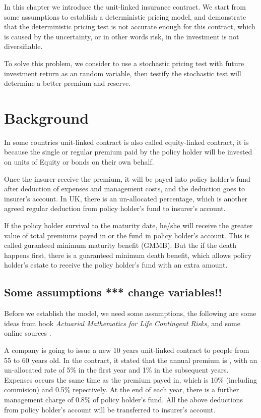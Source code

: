 \documentclass{report}
\begin{document}

In this chapter we introduce the unit-linked insurance contract. We start from some assumptions to establish a deterministic pricing model, and demonstrate that the deterministic pricing test is not accurate enough for this contract, which is caused by the uncertainty, or in other words risk, in the investment is not diversifiable.  

To solve this problem, we consider to use a stochastic pricing test with future investment return as an random variable, then testify the stochastic test will determine a better premium and reserve. 


\section{Background}

In some countries unit-linked contract is also called equity-linked contract, it is because the single or regular premium paid by the policy holder will be invested on units of Equity or bonds on their own behalf.


Once the insurer receive the premium, it will be payed into policy holder's fund after deduction of expenses and management costs, and the deduction goes to insurer's account. In UK, there is an un-allocated percentage, which is another agreed regular deduction from policy holder's fund to insurer's account.

 \cite{bib:GMMB}If the policy holder survival to the maturity date, he/she will receive the greater value of total premiums payed in or the fund in policy holder's account. This is called guranteed minimum maturity benefit (GMMB). But the if the death happens first, there is a guaranteed minimum death benefit, which allows policy holder's estate to receive the policy holder's fund with an extra amount. 


\subsection{Some assumptions *** change variables!!} 

Before we establish the model, we need some assumptions, the following are some ideas from  \cite{bib:unitlinkeg} book {\em Actuarial Mathematics for Life Contingent Risks,} and some online sources \cite{bib:unitlinkegonline}. 


A company is going to issue a new 10 years unit-linked contract to people from 55 to 60 years old. In the contract, it stated that the annual premium is , with an un-allocated rate of 5\% in the first year and 1\% in the subsequent years. Expenses occurs the same time as the premium payed in, which is 10\% (including commision) and 0.5\% repectively. At the end of each year, there is a further management charge of 0.8\% of policy holder's fund. All the above deductions from policy holder's account will be transferred to insurer's account.
\end{document}

